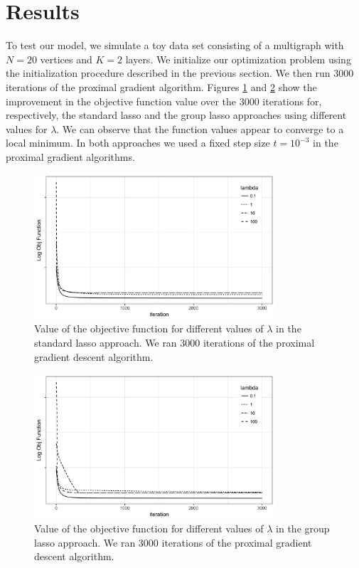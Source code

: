 \documentclass{article}
\begin{document}
\section{Results}

To test our model, we simulate a toy data set consisting of a multigraph with $N=20$ vertices and $K=2$ layers. We initialize our optimization problem using the initialization procedure described in the previous section. We then run $3000$ iterations of the proximal gradient algorithm. Figures \ref{fig:obj_lasso} and \ref{fig:obj_group} show the improvement in the objective function value over the 3000 iterations for, respectively, the standard lasso and the group lasso approaches using different values for $\lambda$. We can observe that the function values appear to converge to a local minimum. In both approaches we used a fixed step size $t=10^{-3}$ in the proximal gradient algorithms.


\begin{figure}[h!]
   \centering
   \includegraphics[width=0.8\textwidth]{plot_objective_individual} %
   \caption{Value of the objective function for different values of $\lambda$ in the standard lasso approach. We ran 3000 iterations of the proximal gradient descent algorithm.}
   \label{fig:obj_lasso}
\end{figure}

\begin{figure}[h!]
   \centering
   \includegraphics[width=0.8\textwidth]{plot_objective_group} %
   \caption{Value of the objective function for different values of $\lambda$ in the group lasso approach. We ran 3000 iterations of the proximal gradient descent algorithm.}
   \label{fig:obj_group}
\end{figure}
\end{document}
